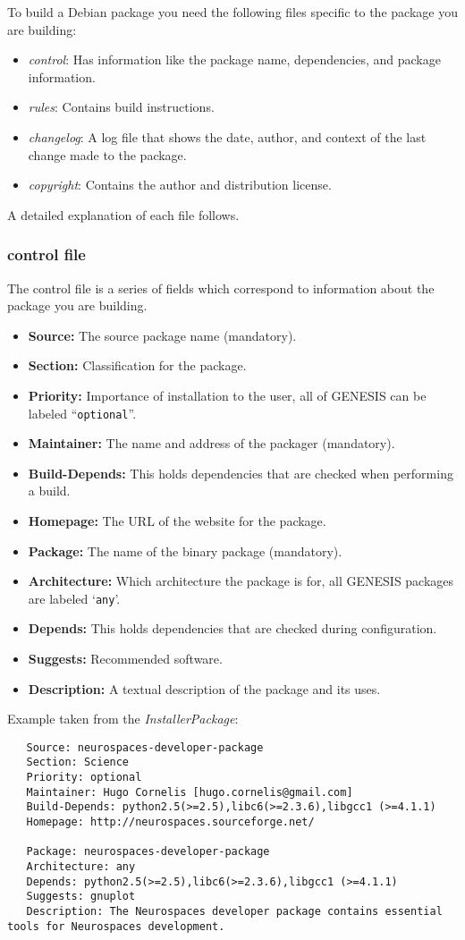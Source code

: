 \documentclass[12pt]{article}
\begin{document}
To build a Debian package you need the following files specific to the package you are building:
\begin{itemize}
\item {\it control}: Has information like the package name, dependencies, and package information.
\item {\it rules}: Contains build instructions.
\item {\it changelog}: A log file that shows the date, author, and context of the last change made to the package.
\item {\it copyright}: Contains the author and distribution license. 
\end{itemize}

A detailed explanation of each file follows.

\subsubsection*{control file}

The control file is a series of fields which correspond to information about the package you are building.
\begin{itemize}
\item {\bf Source:} The source package name ({\color{red}mandatory}).
\item {\bf Section:} Classification for the package.
\item {\bf Priority:} Importance of installation to the user, all of GENESIS can be labeled ``{\tt optional}''.
\item {\bf Maintainer:} The name and address of the packager ({\color{red}mandatory}).
\item {\bf Build-Depends:} This holds dependencies that are checked when performing a build.
\item {\bf Homepage:} The URL of the website for the package.
\item {\bf Package:} The name of the binary package ({\color{red}mandatory}).
\item {\bf Architecture:} Which architecture the package is for, all GENESIS packages are labeled `{\tt any}'.
\item {\bf Depends:} This holds dependencies that are checked during configuration.
\item {\bf Suggests:} Recommended software.
\item {\bf Description:} A textual description of the package and its uses. 
\end{itemize}
Example taken from the {\it InstallerPackage}:
\begin{verbatim}
   Source: neurospaces-developer-package
   Section: Science 
   Priority: optional
   Maintainer: Hugo Cornelis [hugo.cornelis@gmail.com]
   Build-Depends: python2.5(>=2.5),libc6(>=2.3.6),libgcc1 (>=4.1.1)
   Homepage: http://neurospaces.sourceforge.net/
   
   Package: neurospaces-developer-package
   Architecture: any
   Depends: python2.5(>=2.5),libc6(>=2.3.6),libgcc1 (>=4.1.1)
   Suggests: gnuplot
   Description: The Neurospaces developer package contains essential tools for Neurospaces development.
\end{verbatim}
\end{document}
